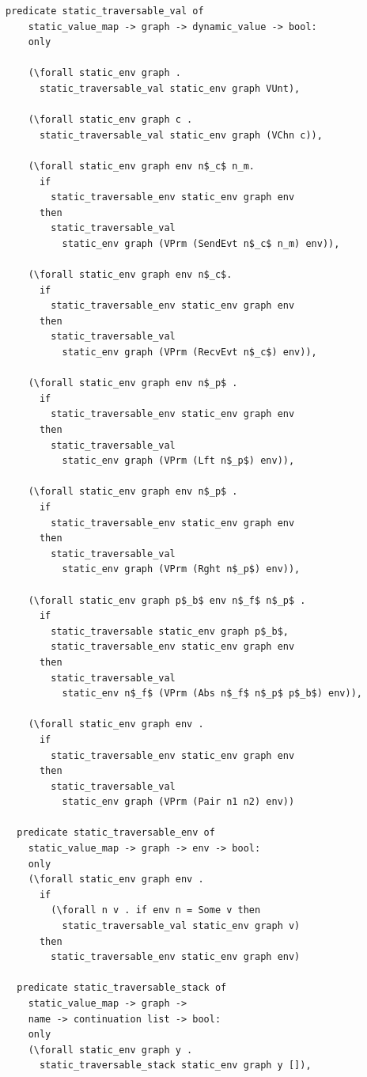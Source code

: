 \documentclass[10pt]{article}
\begin{document}
\begin{lstlisting}[language=logic, mathescape]
  predicate static_traversable_val of
    static_value_map -> graph -> dynamic_value -> bool:
    only

    (\forall static_env graph .
      static_traversable_val static_env graph VUnt), 

    (\forall static_env graph c .
      static_traversable_val static_env graph (VChn c)),

    (\forall static_env graph env n$_c$ n_m.
      if
        static_traversable_env static_env graph env 
      then 
        static_traversable_val
          static_env graph (VPrm (SendEvt n$_c$ n_m) env)),

    (\forall static_env graph env n$_c$.
      if
        static_traversable_env static_env graph env 
      then
        static_traversable_val
          static_env graph (VPrm (RecvEvt n$_c$) env)),

    (\forall static_env graph env n$_p$ .
      if
        static_traversable_env static_env graph env 
      then
        static_traversable_val
          static_env graph (VPrm (Lft n$_p$) env)),

    (\forall static_env graph env n$_p$ .
      if
        static_traversable_env static_env graph env
      then
        static_traversable_val
          static_env graph (VPrm (Rght n$_p$) env)),

    (\forall static_env graph p$_b$ env n$_f$ n$_p$ .
      if
        static_traversable static_env graph p$_b$, 
        static_traversable_env static_env graph env
      then
        static_traversable_val
          static_env n$_f$ (VPrm (Abs n$_f$ n$_p$ p$_b$) env)),

    (\forall static_env graph env . 
      if
        static_traversable_env static_env graph env
      then
        static_traversable_val
          static_env graph (VPrm (Pair n1 n2) env))

  predicate static_traversable_env of
    static_value_map -> graph -> env -> bool: 
    only 
    (\forall static_env graph env .
      if
        (\forall n v . if env n = Some v then
          static_traversable_val static_env graph v)
      then
        static_traversable_env static_env graph env) 

  predicate static_traversable_stack of
    static_value_map -> graph ->
    name -> continuation list -> bool:
    only
    (\forall static_env graph y .
      static_traversable_stack static_env graph y []),


\end{lstlisting}
\end{document}
